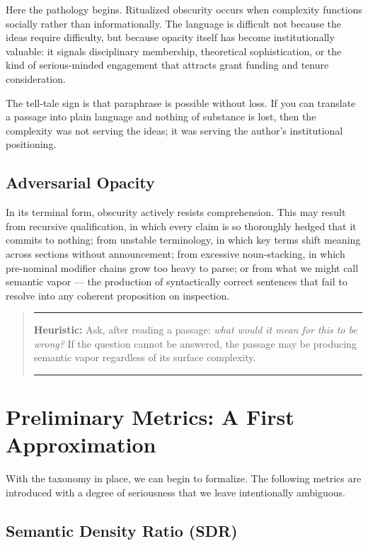 \documentclass[12pt, a4paper]{article}
\newenvironment{claritybox}
  {\begin{quote}\small\color{fogblue}\rule{\linewidth}{0.6pt}\par\smallskip}
  {\par\smallskip\rule{\linewidth}{0.4pt}\end{quote}}
\begin{document}
Here the pathology begins. Ritualized obscurity occurs when complexity functions socially rather than informationally. The language is difficult not because the ideas require difficulty, but because opacity itself has become institutionally valuable: it signals disciplinary membership, theoretical sophistication, or the kind of serious-minded engagement that attracts grant funding and tenure consideration.

The tell-tale sign is that paraphrase is possible without loss. If you can translate a passage into plain language and nothing of substance is lost, then the complexity was not serving the ideas; it was serving the author's institutional positioning.

\subsection{Adversarial Opacity}

In its terminal form, obscurity actively resists comprehension. This may result from recursive qualification, in which every claim is so thoroughly hedged that it commits to nothing; from unstable terminology, in which key terms shift meaning across sections without announcement; from excessive noun-stacking, in which pre-nominal modifier chains grow too heavy to parse; or from what we might call semantic vapor --- the production of syntactically correct sentences that fail to resolve into any coherent proposition on inspection.

\begin{claritybox}
\textbf{Heuristic:} Ask, after reading a passage: \textit{what would it mean for this to be wrong?} If the question cannot be answered, the passage may be producing semantic vapor regardless of its surface complexity.
\end{claritybox}


\section{Preliminary Metrics: A First Approximation}

With the taxonomy in place, we can begin to formalize. The following metrics are introduced with a degree of seriousness that we leave intentionally ambiguous.

\subsection{Semantic Density Ratio (SDR)}
\end{document}
